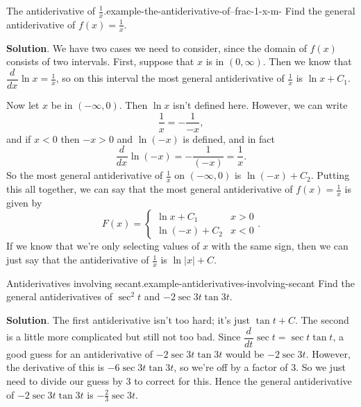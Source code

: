 \documentclass[10pt,]{book}
\numberwithin{equation}{section}
\newcommand{\dv}[3][]{\dfrac{d^{#1} #2}{d #3^{#1}}}
\begin{document}
\begin{example}{The antiderivative of \(\frac{1}{x}\).}{example-the-antiderivative-of--frac-1-x-m-}%
\hypertarget{p-387}{}%
Find the general antiderivative of \(f(x) = \frac{1}{x}\).%
\par\smallskip%
\noindent\textbf{Solution}.\hypertarget{solution-86}{}\quad%
\hypertarget{p-388}{}%
We have two cases we need to consider, since the domain of \(f(x)\) consists of two intervals. First, suppose that \(x\) is in \((0,\infty)\). Then we know that \(\dv{}{x}\ln x = \frac{1}{x}\), so on this interval the most general antiderivative of \(\frac{1}{x}\) is \(\ln x + C_{1}\).%
\par
\hypertarget{p-389}{}%
Now let \(x\) be in \((-\infty,0)\). Then \(\ln x\) isn't defined here. However, we can write%
\begin{equation*}
\frac{1}{x} = -\frac{1}{-x},
\end{equation*}
and if \(x < 0\) then \(-x > 0\) and \(\ln(-x)\) is defined, and in fact%
\begin{equation*}
\dv{}{x}\ln(-x) = -\frac{1}{(-x)} = \frac{1}{x}.
\end{equation*}
So the most general antiderivative of \(\frac{1}{x}\) on \((-\infty,0)\) is \(\ln(-x) + C_{2}\). Putting this all together, we can say that the most general antiderivative of \(f(x) = \frac{1}{x}\) is given by%
\begin{equation*}
F(x) = \begin{cases} \ln x + C_{1} & x > 0 \\ \ln(-x) + C_{2} & x < 0\end{cases}.
\end{equation*}
If we know that we're only selecting values of \(x\) with the same sign, then we can just say that the antiderivative of \(\frac{1}{x}\) is \(\ln|x| + C\).%
\end{example}
\begin{example}{Antiderivatives involving secant.}{example-antiderivatives-involving-secant}%
\hypertarget{p-390}{}%
Find the general antiderivatives of \(\sec^{2}t\) and \(-2\sec3t\tan3t\).%
\par\smallskip%
\noindent\textbf{Solution}.\hypertarget{solution-87}{}\quad%
\hypertarget{p-391}{}%
The first antiderivative isn't too hard; it's just \(\tan t+C\). The second is a little more complicated but still not too bad. Since \(\dv{}{t}\sec t = \sec t\tan t\), a good guess for an antiderivative of \(-2\sec3t\tan3t\) would be \(-2\sec3t.\) However, the derivative of this is \(-6\sec3t\tan3t\), so we're off by a factor of \(3\). So we just need to divide our guess by \(3\) to correct for this. Hence the general antiderivative of \(-2\sec3t\tan3t\) is \(-\frac{2}{3}\sec3t\).%
\end{example}
\end{document}
